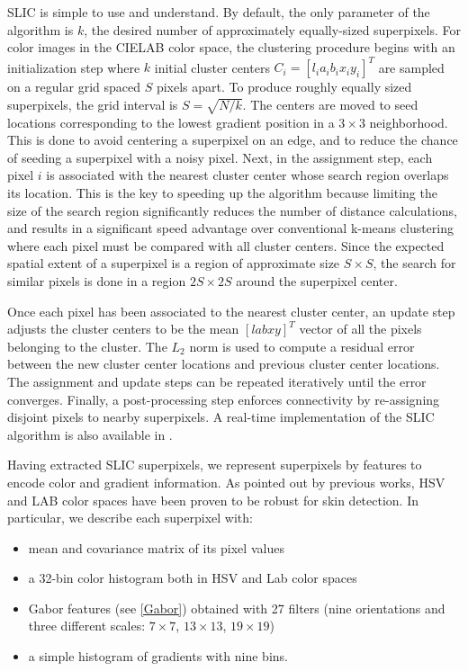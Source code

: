 SLIC is simple to use and understand. By default, the only parameter of the algorithm is $k$, the desired number of approximately equally-sized superpixels. For color images in the CIELAB color space, the clustering procedure begins with an initialization step where $k$ initial cluster centers $C_i = [l_i a_i b_i x_i y_i]^T$ are sampled on a regular grid spaced $S$ pixels apart. To produce roughly equally sized superpixels, the grid interval is $S =\sqrt{N/k}$. The centers are moved to seed locations corresponding to the lowest gradient position in a $3\times 3$ neighborhood. This is done to avoid centering a superpixel on an edge, and to reduce the chance of seeding a superpixel with a noisy pixel. Next, in the assignment step, each pixel $i$ is associated with the nearest cluster center whose search region overlaps its location. This is the key to speeding up the algorithm because limiting the size of the search region
significantly reduces the number of distance calculations, and results in a significant speed advantage over conventional k-means clustering where each pixel must be compared with all cluster centers. Since the expected spatial extent of a superpixel is a region of
approximate size $S\times S$, the search for similar pixels is done in a region $2S \times 2S$ around the superpixel center.

Once each pixel has been associated to the nearest cluster center, an update step adjusts the cluster centers to be the mean
$[l a b x y]^T$ vector of all the pixels belonging to the cluster. The $L_2$ norm is used to compute a residual error  between
the new cluster center locations and previous cluster center locations. The assignment and update steps can be repeated
iteratively until the error converges. Finally, a post-processing step enforces connectivity by re-assigning disjoint pixels to
nearby superpixels. A real-time implementation of the SLIC algorithm is also available in \cite{YHRengSLIC}.

Having extracted SLIC superpixels, we represent superpixels by features to encode color and gradient information. As pointed out by previous works, HSV and LAB color spaces have been proven to be robust for skin detection. 
In particular, we describe each superpixel with:
\begin{itemize} 
\item mean and covariance matrix of its pixel values
\item a 32-bin color histogram both in HSV and Lab color spaces
\item Gabor features (see \ref{Gabor}) obtained with 27 filters (nine orientations and three different scales: $7 \times 7$, $13 \times 13$, $19 \times 19$) 
\item a simple histogram of gradients with nine bins. 
\end{itemize}

